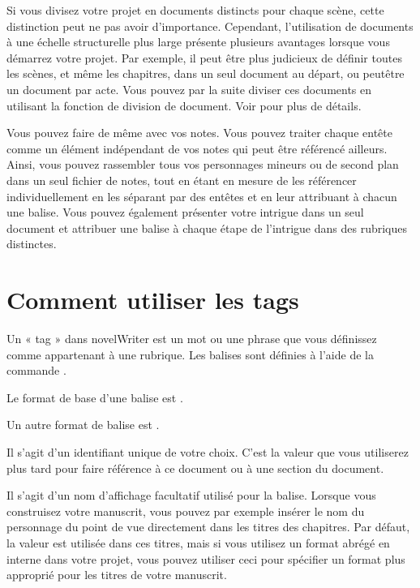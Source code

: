 \documentclass[a4paper,11pt,french]{sphinxmanual}
\begin{document}
\sphinxAtStartPar
Si vous divisez votre projet en documents distincts pour chaque scène, cette distinction peut ne pas avoir d’importance. Cependant, l’utilisation de documents à une échelle structurelle plus large présente plusieurs avantages lorsque vous démarrez votre projet. Par exemple, il peut être plus judicieux de définir toutes les scènes, et même les chapitres, dans un seul document au départ, ou peut\sphinxhyphen{}être un document par acte. Vous pouvez par la suite diviser ces documents en utilisant la fonction de division de document. Voir {\hyperref[\detokenize{usage_project:a-ui-tree-split-merge}]{}} pour plus de détails.

\sphinxAtStartPar
Vous pouvez faire de même avec vos notes. Vous pouvez traiter chaque en\sphinxhyphen{}tête comme un élément indépendant de vos notes qui peut être référencé ailleurs. Ainsi, vous pouvez rassembler tous vos personnages mineurs ou de second plan dans un seul fichier de notes, tout en étant en mesure de les référencer individuellement en les séparant par des en\sphinxhyphen{}têtes et en leur attribuant à chacun une balise. Vous pouvez également présenter votre intrigue dans un seul document et attribuer une balise à chaque étape de l’intrigue dans des rubriques distinctes.


\section{Comment utiliser les tags}
\label{\detokenize{project_references:how-to-use-tags}}\label{\detokenize{project_references:a-references-tags}}
\sphinxAtStartPar
Un « tag » dans novelWriter est un mot ou une phrase que vous définissez comme appartenant à une rubrique. Les balises sont définies à l’aide de la commande  {\hyperref[\detokenize{int_glossary:term-Keyword}]{}}.

\sphinxAtStartPar
Le format de base d’une balise est .

\sphinxAtStartPar
Un autre format de balise est .
\begin{description}
\sphinxAtStartPar
Il s’agit d’un identifiant unique de votre choix. C’est la valeur que vous utiliserez plus tard pour faire référence à ce document ou à une section du document.

\sphinxAtStartPar
Il s’agit d’un nom d’affichage facultatif utilisé pour la balise. Lorsque vous construisez votre manuscrit, vous pouvez par exemple insérer le nom du personnage du point de vue directement dans les titres des chapitres. Par défaut, la valeur  est utilisée dans ces titres, mais si vous utilisez un format abrégé en interne dans votre projet, vous pouvez utiliser ceci pour spécifier un format plus approprié pour les titres de votre manuscrit.

\end{description}
\end{document}
